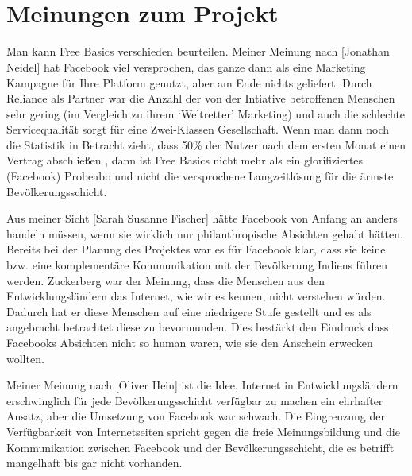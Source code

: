 \documentclass{article}
\begin{document}
\break
\appendix
\section{\\Meinungen zum Projekt}

Man kann Free Basics verschieden beurteilen. Meiner Meinung nach [Jonathan Neidel] hat Facebook viel versprochen, das ganze dann als eine Marketing Kampagne für Ihre Platform genutzt, aber am Ende nichts geliefert. Durch Reliance als Partner war die Anzahl der von der Intiative betroffenen Menschen sehr gering (im Vergleich zu ihrem `Weltretter' Marketing) und auch die schlechte Servicequalität sorgt für eine Zwei-Klassen Gesellschaft. Wenn man dann noch die Statistik in Betracht zieht, dass 50\% der Nutzer nach dem ersten Monat einen Vertrag abschließen \parencite{everydayLife}, dann ist Free Basics nicht mehr als ein glorifiziertes (Facebook) Probeabo und nicht die versprochene Langzeitlösung für die ärmste Bevölkerungsschicht.

\medskip

Aus meiner Sicht [Sarah Susanne Fischer] hätte Facebook von Anfang an anders handeln müssen, wenn sie wirklich nur philanthropische Absichten gehabt hätten. Bereits bei der Planung des Projektes war es für Facebook klar, dass sie keine bzw. eine komplementäre Kommunikation mit der Bevölkerung Indiens führen werden. Zuckerberg war der Meinung, dass die Menschen aus den Entwicklungsländern das Internet, wie wir es kennen, nicht verstehen würden. Dadurch hat er diese Menschen auf eine niedrigere Stufe gestellt und es als angebracht betrachtet diese zu bevormunden. 
Dies bestärkt den Eindruck dass Facebooks Absichten nicht so human waren, wie sie den Anschein erwecken wollten.

\medskip

Meiner Meinung nach [Oliver Hein] ist die Idee, Internet in Entwicklungsländern erschwinglich für jede Bevölkerungsschicht verfügbar zu machen ein ehrhafter Ansatz, aber die Umsetzung von Facebook war schwach. Die Eingrenzung der Verfügbarkeit von Internetseiten spricht gegen die freie Meinungsbildung und die Kommunikation zwischen Facebook und der Bevölkerungsschicht, die es betrifft mangelhaft bis gar nicht vorhanden.

\break
\printbibliography
\end{document}
